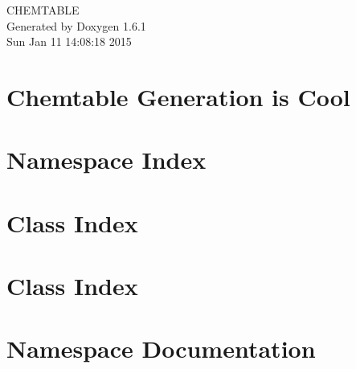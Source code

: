 \documentclass[a4paper]{book}
\begin{document}
\hypersetup{pageanchor=false}
\begin{titlepage}
\vspace*{7cm}
\begin{center}
{\Large CHEMTABLE }\\
\vspace*{1cm}
{\large Generated by Doxygen 1.6.1}\\
\vspace*{0.5cm}
{\small Sun Jan 11 14:08:18 2015}\\
\end{center}
\end{titlepage}
\clearemptydoublepage
{}
\tableofcontents
\clearemptydoublepage
{}
\hypersetup{pageanchor=true}
\chapter{Chemtable Generation is Cool}
\label{index}\hypertarget{index}{}
\chapter{Namespace Index}

\chapter{Class Index}

\chapter{Class Index}

\chapter{Namespace Documentation}




\end{document}
